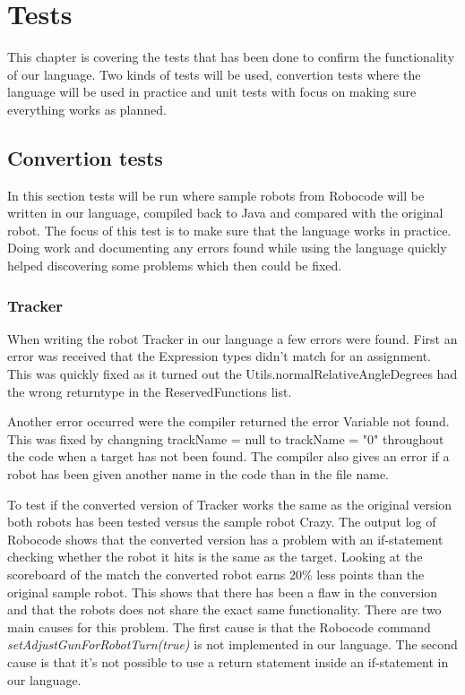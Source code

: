 \chapter{Tests}
This chapter is covering the tests that has been done to confirm the functionality of our language. Two kinds of tests will be used, convertion tests where the language will be used in practice and unit tests with focus on making sure everything works as planned.


\section{Convertion tests}
In this section tests will be run where sample robots from Robocode will be written in our language, compiled back to Java and compared with the original robot. The focus of this test is to make sure that the language works in practice. Doing work and documenting any errors found while using the language quickly helped discovering some problems which then could be fixed. 

\subsection{Tracker}
When writing the robot Tracker in our language a few errors were found. First an error was received that the Expression types didn't match for an assignment. This was quickly fixed as it turned out the Utils.normalRelativeAngleDegrees had the wrong returntype in the ReservedFunctions list.

Another error occurred were the compiler returned the error Variable not found. This was fixed by changning trackName = null to trackName = "0" throughout the code when a target has not been found. The compiler also gives an error if a robot has been given another name in the code than in the file name.

To test if the converted version of Tracker works the same as the original version both robots has been tested versus the sample robot Crazy. The output log of Robocode shows that the converted version has a problem with an if-statement checking whether the robot it hits is the same as the target. Looking at the scoreboard of the match the converted robot earns 20\% less points than the original sample robot. This shows that there has been a flaw in the conversion and that the robots does not share the exact same functionality.
There are two main causes for this problem. The first cause is that the Robocode command \emph{setAdjustGunForRobotTurn(true)} is not implemented in our language. The second cause is that it's not possible to use a return statement inside an if-statement in our language.


